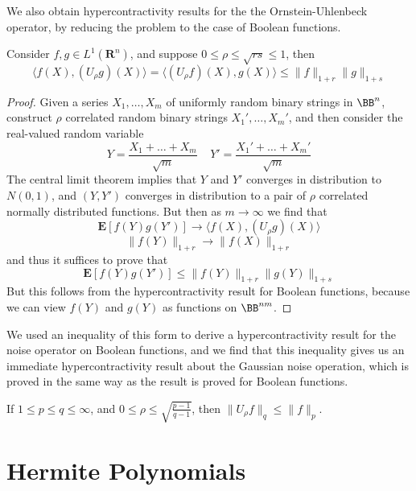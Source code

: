We also obtain hypercontractivity results for the the Ornstein-Uhlenbeck operator, by reducing the problem to the case of Boolean functions.

\begin{theorem}
    Consider $f,g \in L^1(\mathbf{R}^n)$, and suppose $0 \leq \rho \leq \sqrt{rs} \leq 1$, then
    \[ \langle f(X), (U_\rho g)(X) \rangle = \langle (U_\rho f)(X), g(X) \rangle \leq \| f \|_{1 + r} \| g \|_{1 + s} \]
\end{theorem}
\begin{proof}
    Given a series $X_1, \dots, X_m$ of uniformly random binary strings in $\BB^n$, construct $\rho$ correlated random binary strings $X_1', \dots, X_m'$, and then consider the real-valued random variable
    \[ Y = \frac{X_1 + \dots + X_m}{\sqrt{m}}\ \ \ \ \ Y' = \frac{X_1' + \dots + X_m'}{\sqrt{m}} \]
    The central limit theorem implies that $Y$ and $Y'$ converges in distribution to $N(0,1)$, and $(Y,Y')$ converges in distribution to a pair of $\rho$ correlated normally distributed functions. But then as $m \to \infty$ we find that
    \[ \mathbf{E}[f(Y)g(Y')] \to \langle f(X), (U_\rho g)(X) \rangle \]
    \[ \| f(Y) \|_{1 + r} \to \| f(X) \|_{1 + r} \]
    and thus it suffices to prove that
    \[ \mathbf{E}[f(Y)g(Y')] \leq \| f(Y) \|_{1 + r} \| g(Y) \|_{1 + s} \]
    But this follows from the hypercontractivity result for Boolean functions, because we can view $f(Y)$ and $g(Y)$ as functions on $\BB^{nm}$.
\end{proof}

We used an inequality of this form to derive a hypercontractivity result for the noise operator on Boolean functions, and we find that this inequality gives us an immediate hypercontractivity result about the Gaussian noise operation, which is proved in the same way as the result is proved for Boolean functions.

\begin{corollary}
    If $1 \leq p \leq q \leq \infty$, and $0 \leq \rho \leq \sqrt{\frac{p-1}{q-1}}$, then $\| U_\rho f \|_q \leq \| f \|_p$.
\end{corollary}

\section{Hermite Polynomials}

